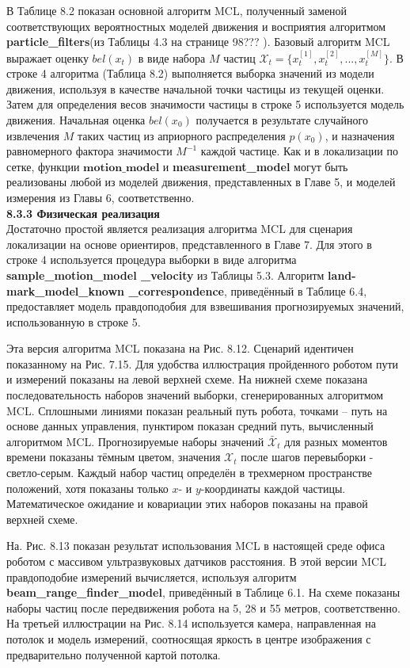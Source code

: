 \documentclass[10pt,a4paper]{article}
\begin{document}
В Таблице 8.2 показан основной алгоритм MCL, полученный заменой соответствующих вероятностных моделей движения и восприятия алгоритмом \textbf{particle\_filters}(из Таблицы 4.3 на странице 98??? ). Базовый алгоритм MCL выражает оценку $bel(x_t)$ в виде набора $M$ частиц $\mathcal{X}_t=\{x_t^{[1]},x_t^{[2]},...,x_t^{[M]}\}$. В строке 4 алгоритма (Таблица 8.2) выполняется выборка значений из модели движения, используя в качестве начальной точки частицы из текущей оценки. Затем для определения весов значимости частицы в строке 5 используется модель движения. Начальная оценка $bel(x_0)$ получается в результате случайного извлечения $M$ таких частиц из априорного распределения $p(x_0)$, и назначения равномерного фактора значимости $M^{-1}$ каждой частице.  Как и в локализации по сетке, функции $\textbf{motion\_model}$ и
\textbf{measurement\_model} могут быть реализованы любой из моделей движения, представленных в Главе 5, и моделей измерения из Главы 6, соответственно.\\

\textbf{8.3.3	Физическая реализация}\\

Достаточно простой является реализация алгоритма MCL для сценария локализации на основе ориентиров, представленного в Главе 7. Для этого в строке 4 используется процедура выборки  в виде алгоритма \textbf{sample\_motion\_model \_velocity} из Таблицы 5.3. Алгоритм \textbf{land- mark\_model\_known \_correspondence}, приведённый в Таблице 6.4, предоставляет модель правдоподобия для взвешивания прогнозируемых значений, использованную в строке 5.

  Эта версия алгоритма MCL показана на Рис. 8.12. Сценарий идентичен показанному на Рис. 7.15. Для удобства иллюстрация пройденного роботом пути и измерений показаны на левой верхней схеме. На нижней схеме показана последовательность наборов значений выборки, сгенерированных алгоритмом MCL. Сплошными линиями показан реальный путь робота, точками – путь на основе данных управления, пунктиром показан средний путь, вычисленный алгоритмом MCL. Прогнозируемые наборы значений $\bar{\mathcal{X}}_t$ для разных моментов времени показаны тёмным цветом, значения $\mathcal{X}_t$ после шагов перевыборки - светло-серым. Каждый набор частиц определён в трехмерном пространстве положений, хотя показаны только $x$- и $y$-координаты каждой частицы. Математическое ожидание и ковариации этих наборов показаны на правой верхней схеме.

На. Рис. 8.13 показан результат использования MCL в настоящей  среде офиса роботом с массивом ультразвуковых датчиков расстояния. В этой версии MCL правдоподобие измерений вычисляется, используя алгоритм \textbf{beam\_range\_finder\_model}, приведённый в Таблице 6.1. На схеме показаны наборы частиц после передвижения робота на 5, 28 и 55 метров, соответственно. На третьей иллюстрации на Рис. 8.14 используется камера, направленная на потолок и модель измерений, соотносящая яркость в центре изображения с предварительно полученной картой потолка.\\
\end{document}
